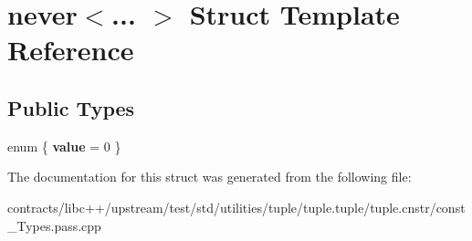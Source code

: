 \hypertarget{structnever}{}\section{never$<$... $>$ Struct Template Reference}
\label{structnever}
\subsection*{Public Types}
\begin{DoxyCompactItemize}
\item 
\mbox{\label{structnever_a9a2fcb3ad9c1c67c72d7122a7d989c9f}} 
enum \{ {\bfseries value} = 0
 \}
\end{DoxyCompactItemize}


The documentation for this struct was generated from the following file\+:\begin{DoxyCompactItemize}
\item 
contracts/libc++/upstream/test/std/utilities/tuple/tuple.\+tuple/tuple.\+cnstr/const\+\_\+\+Types.\+pass.\+cpp\end{DoxyCompactItemize}
